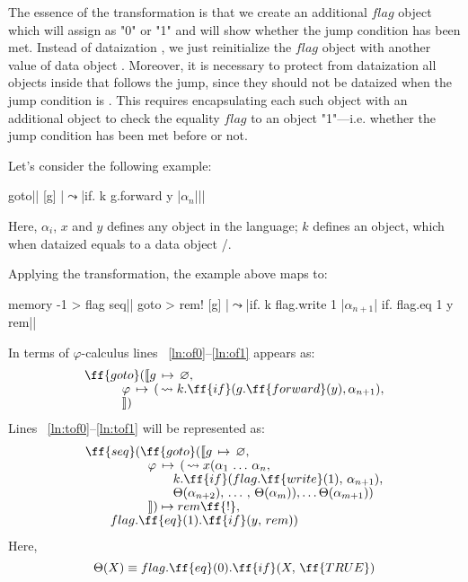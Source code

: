 \documentclass[sigplan,review,11pt,nonacm,natbib=false]{acmart}
\theoremstyle{theorems}
\newcommand\br{\\[-4pt]}
\begin{document}
The essence of the transformation is that we create an additional $flag$ object which will assign as "0" or "1" and will show whether the jump condition has been met.
Instead of dataization , we just reinitialize the $flag$ object with another value of data object .
Moreover, it is necessary to protect from dataization all objects inside  that follows the jump, since they should not be dataized when the jump condition is .
This requires encapsulating each such object with an additional object  to check the equality $flag$ to an object "1"---i.e. whether the jump condition has been met before or not.

Let's consider the following example:
\begin{ffcode}
goto|$\label{ln:of0}$|
  [g]
   |$\leadsto$|if.
      k
      g.forward y
      |$\alpha_{n}$||$\label{ln:of1}$|
\end{ffcode}
Here, $\alpha_i$, $x$ and $y$ defines any object in the language; $k$ defines an object, which when dataized equals to a data object /.

Applying the transformation, the example above maps
to:
\begin{ffcode}
memory -1 > flag
seq|$\label{ln:tof0}$|
  goto > rem!
    [g]
     |$\leadsto$|if.
        k
        flag.write 1
        |$\alpha_{n+1}$|
  if.
    flag.eq 1
    y
    rem|$\label{ln:tof1}$|
\end{ffcode}

In terms of $\varphi$-calculus lines ~\ref{ln:of0}--\ref{ln:of1} appears as:
\begin{equation}
\begin{split}
& \ff{goto}(\llbracket g\,\mapsto\,\varnothing,\br
& \quad \quad \quad \varphi\,\mapsto\,(\,\leadsto k.\ff{if}(g.\ff{forward}(y), \alpha_{n+1}), \br
& \quad \quad \quad \rrbracket) \\
\end{split}
\end{equation}
Lines ~\ref{ln:tof0}--\ref{ln:tof1} will be represented as:
\begin{equation}
\begin{split}
& \ff{seq}(\ff{goto}(\llbracket g\,\mapsto\,\varnothing,\br
& \quad \quad \quad \quad \quad \varphi\,\mapsto\,(\,\leadsto x(\alpha_1\,\ldots\,\alpha_n, \br
& \quad \quad \quad \quad \quad \quad \quad k.\ff{if}(flag.\ff{write}(1),\,\alpha_{n+1}), \br
& \quad \quad \quad \quad \quad \quad \quad \Theta(\alpha_{n+2}),\,\ldots\,,\,\Theta(\alpha_m)),\ldots\Theta(\alpha_{m+1})) \br
& \quad \quad \quad \quad \quad \rrbracket)\mapsto rem\ff{!}, \br
& \quad \quad flag.\ff{eq}(1).\ff{if}(y,\,rem)) \\
\end{split}
\end{equation}
Here,
\begin{equation}
\Theta(X) \equiv flag.\ff{eq}(0).\ff{if}(X,\,\ff{TRUE})
\end{equation}
\end{document}

